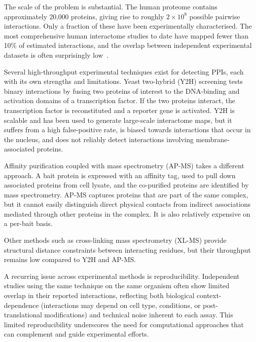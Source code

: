 The scale of the problem is substantial.
The human proteome contains approximately 20,000 proteins, giving rise to roughly $2 \times 10^{8}$ possible pairwise interactions.
Only a fraction of these have been experimentally characterised.
The most comprehensive human interactome studies to date have mapped fewer than 10\% of estimated interactions, and the overlap between independent experimental datasets is often surprisingly low~\cite{zhang2025ppi}.

Several high-throughput experimental techniques exist for detecting PPIs, each with its own strengths and limitations.
Yeast two-hybrid (Y2H) screening tests binary interactions by fusing two proteins of interest to the DNA-binding and activation domains of a transcription factor.
If the two proteins interact, the transcription factor is reconstituted and a reporter gene is activated.
Y2H is scalable and has been used to generate large-scale interactome maps, but it suffers from a high false-positive rate, is biased towards interactions that occur in the nucleus, and does not reliably detect interactions involving membrane-associated proteins.

Affinity purification coupled with mass spectrometry (AP-MS) takes a different approach.
A bait protein is expressed with an affinity tag, used to pull down associated proteins from cell lysate, and the co-purified proteins are identified by mass spectrometry.
AP-MS captures proteins that are part of the same complex, but it cannot easily distinguish direct physical contacts from indirect associations mediated through other proteins in the complex.
It is also relatively expensive on a per-bait basis.

Other methods such as cross-linking mass spectrometry (XL-MS) provide structural distance constraints between interacting residues, but their throughput remains low compared to Y2H and AP-MS.

A recurring issue across experimental methods is reproducibility.
Independent studies using the same technique on the same organism often show limited overlap in their reported interactions, reflecting both biological context-dependence (interactions may depend on cell type, conditions, or post-translational modifications) and technical noise inherent to each assay.
This limited reproducibility underscores the need for computational approaches that can complement and guide experimental efforts.


